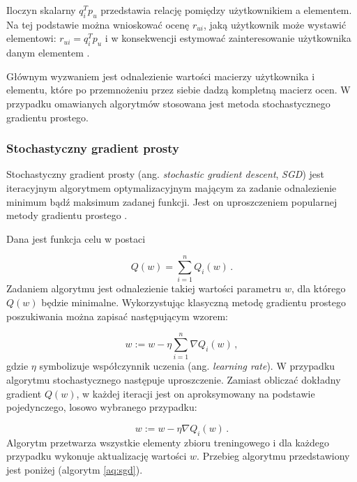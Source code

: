 \documentclass[twoside]{iisthesis}
\begin{document}
		Iloczyn skalarny $q_i^T p_u$ przedstawia relację pomiędzy użytkownikiem a elementem. Na tej podstawie można wnioskować ocenę $r_{ui}$, jaką użytkownik może wystawić elementowi: $r_{ui} = q_i^T p_u$ i w konsekwencji estymować zainteresowanie użytkownika danym elementem \cite{koren2009matrix}.
		
		Głównym wyzwaniem jest odnalezienie wartości macierzy użytkownika i elementu, które po przemnożeniu przez siebie dadzą kompletną macierz ocen. W przypadku omawianych algorytmów stosowana jest metoda stochastycznego gradientu prostego. 
			
		\subsubsection{Stochastyczny gradient prosty}
			
		Stochastyczny gradient prosty (ang. \textit{stochastic gradient descent}, \textit{SGD}) jest iteracyjnym algorytmem optymalizacyjnym mającym za zadanie odnalezienie minimum bądź maksimum zadanej funkcji. Jest on uproszczeniem popularnej metody gradientu prostego \cite{bottou2012stochastic}.
				 
		Dana jest funkcja celu w postaci
		
		\begin{equation}
		\label{eq:sgd1}
		Q(w) = \sum_{i=1}^{n}Q_i(w)
		\,.
		\end{equation}			
		Zadaniem algorytmu jest odnalezienie takiej wartości parametru $w$, dla którego $Q(w)$ będzie minimalne. Wykorzystując klasyczną metodę gradientu prostego poszukiwania można zapisać następującym wzorem:
		
		\begin{equation}
		\label{eq:sgd2}
		w:= w - \eta \sum_{i=1}^{n} \nabla Q_i(w)
		\,,
		\end{equation}			
		gdzie $\eta$ symbolizuje współczynnik uczenia (ang. \textit{learning rate}). W przypadku algorytmu stochastycznego następuje uproszczenie. Zamiast obliczać dokładny gradient $Q(w)$, w każdej iteracji jest  on aproksymowany na podstawie pojedynczego, losowo wybranego przypadku:
		
		\begin{equation}
		\label{eq:sgd3}
		w:= w - \eta \nabla Q_i(w)
		\,.
		\end{equation}			
		Algorytm przetwarza wszystkie elementy zbioru treningowego i dla każdego przypadku wykonuje aktualizację wartości $w$. Przebieg algorytmu przedstawiony jest poniżej (algorytm \ref{aq:sgd}).
			
\end{document}
